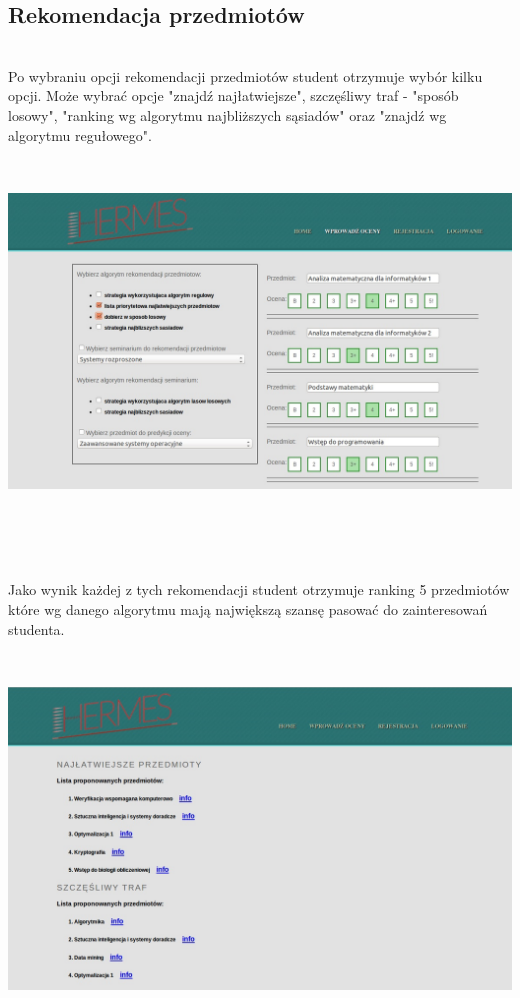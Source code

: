 \documentclass[licencjacka]{pracamgr}
\begin{document}
\subsection{Rekomendacja przedmiotów} ~\\ \indent
Po wybraniu opcji rekomendacji przedmiotów student otrzymuje wybór kilku opcji. Może wybrać opcje "znajdź najłatwiejsze", szczęśliwy traf - "sposób losowy", "ranking wg algorytmu najbliższych sąsiadów" oraz "znajdź wg algorytmu regułowego". \par
 ~\\
\begin{minipage}{\linewidth}
	\centering
           \includegraphics[scale=0.5]{rekPrzedm.jpg}
\end{minipage} \\  \\ \\

\newpage

Jako wynik każdej z tych rekomendacji student otrzymuje ranking 5 przedmiotów które wg danego algorytmu mają największą szansę pasować do zainteresowań studenta. \par
 ~\\
\begin{minipage}{\linewidth} 
	\centering
           \includegraphics[scale=0.5]{rekPrzedmRank.jpg}
\end{minipage} \\ 
\end{document}
